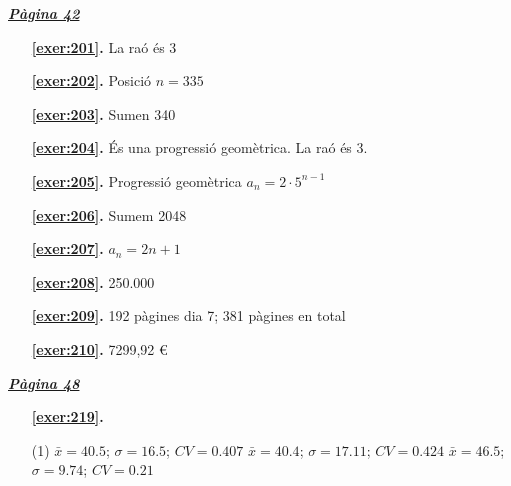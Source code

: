 \hyperlink{page.42}{\textbf{\em Pàgina 42}}
\begin{enumerate}
\item[\fontfamily{phv}\selectfont\color{blue}\textbf{\ref{exer:201}. }] \label{ans:201} 
La raó és 3
 \end{enumerate}
\begin{enumerate}
\item[\fontfamily{phv}\selectfont\color{blue}\textbf{\ref{exer:202}. }] \label{ans:202} 
Posició $n=335$
\item[\fontfamily{phv}\selectfont\color{blue}\textbf{\ref{exer:203}. }] \label{ans:203} 
Sumen 340
\item[\fontfamily{phv}\selectfont\color{blue}\textbf{\ref{exer:204}. }] \label{ans:204} 
És una progressió geomètrica. La raó és 3.
\item[\fontfamily{phv}\selectfont\color{blue}\textbf{\ref{exer:205}. }] \label{ans:205} 
Progressió geomètrica $a_{n} = 2·5^{n-1}$ 
\item[\fontfamily{phv}\selectfont\color{blue}\textbf{\ref{exer:206}. }] \label{ans:206} 
Sumem 2048
\item[\fontfamily{phv}\selectfont\color{blue}\textbf{\ref{exer:207}. }] \label{ans:207} 
 $a_{ n} = 2n + 1$ 
\item[\fontfamily{phv}\selectfont\color{blue}\textbf{\ref{exer:208}. }] \label{ans:208} 
250.000
\item[\fontfamily{phv}\selectfont\color{blue}\textbf{\ref{exer:209}. }] \label{ans:209} 
192 pàgines dia 7; 381 pàgines en total
\item[\fontfamily{phv}\selectfont\color{blue}\textbf{\ref{exer:210}. }] \label{ans:210} 
7299,92 \euro {}
 \end{enumerate}

 \vspace{1cm} 
 

\vspace{0.3cm}


\hyperlink{page.48}{\textbf{\em Pàgina 48}}
\begin{enumerate}



 \item[\fontfamily{phv}\selectfont\color{blue}\textbf{\ref{exer:219}. }] \label{ans:219}
 \begin{tasks}[column-sep=1em, item-indent=1.3333em](1)
	 \task* $\bar x=40.5$; $\sigma =16.5$; $CV=0.407$
	 \task* $\bar x=40.4$; $\sigma =17.11$; $CV=0.424$
	 \task* $\bar x=46.5$; $\sigma =9.74$; $CV=0.21$ \par {}
\end{tasks}
 \end{enumerate}
\vspace{0.3cm}

